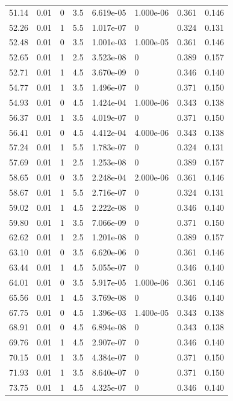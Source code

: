 \documentclass[preview]{standalone}
\begin{document}
{{{\begin{tabular}{L{1.2cm}C{1.2cm} C{0.3cm}C{0.5cm} C{1.4cm}C{1.4cm} C{1.4cm}C{1.4cm}}
  51.14  &  0.01  & 0     & 3.5 &  6.619e-05  & 1.000e-06  & 0.361 &  0.146   \\ 
  52.26  &  0.01  & 1     & 5.5 &  1.017e-07  & 0  & 0.324 &  0.131   \\ 
  52.48  &  0.01  & 0     & 3.5 &  1.001e-03  & 1.000e-05  & 0.361 &  0.146   \\ 
  52.65  &  0.01  & 1     & 2.5 &  3.523e-08  & 0  & 0.389 &  0.157   \\ 
  52.71  &  0.01  & 1     & 4.5 &  3.670e-09  & 0  & 0.346 &  0.140   \\ 
  54.77  &  0.01  & 1     & 3.5 &  1.496e-07  & 0  & 0.371 &  0.150   \\ 
  54.93  &  0.01  & 0     & 4.5 &  1.424e-04  & 1.000e-06  & 0.343 &  0.138   \\ 
  56.37  &  0.01  & 1     & 3.5 &  4.019e-07  & 0  & 0.371 &  0.150   \\ 
  56.41  &  0.01  & 0     & 4.5 &  4.412e-04  & 4.000e-06  & 0.343 &  0.138   \\ 
  57.24  &  0.01  & 1     & 5.5 &  1.783e-07  & 0  & 0.324 &  0.131   \\ 
  57.69  &  0.01  & 1     & 2.5 &  1.253e-08  & 0  & 0.389 &  0.157   \\ 
  58.65  &  0.01  & 0     & 3.5 &  2.248e-04  & 2.000e-06  & 0.361 &  0.146   \\ 
  58.67  &  0.01  & 1     & 5.5 &  2.716e-07  & 0  & 0.324 &  0.131   \\ 
  59.02  &  0.01  & 1     & 4.5 &  2.222e-08  & 0  & 0.346 &  0.140   \\ 
  59.80  &  0.01  & 1     & 3.5 &  7.066e-09  & 0  & 0.371 &  0.150   \\ 
  62.62  &  0.01  & 1     & 2.5 &  1.201e-08  & 0  & 0.389 &  0.157   \\ 
  63.10  &  0.01  & 0     & 3.5 &  6.620e-06  & 0  & 0.361 &  0.146   \\ 
  63.44  &  0.01  & 1     & 4.5 &  5.055e-07  & 0  & 0.346 &  0.140   \\ 
  64.01  &  0.01  & 0     & 3.5 &  5.917e-05  & 1.000e-06  & 0.361 &  0.146   \\ 
  65.56  &  0.01  & 1     & 4.5 &  3.769e-08  & 0  & 0.346 &  0.140   \\ 
  67.75  &  0.01  & 0     & 4.5 &  1.396e-03  & 1.400e-05  & 0.343 &  0.138   \\ 
  68.91  &  0.01  & 0     & 4.5 &  6.894e-08  & 0  & 0.343 &  0.138   \\ 
  69.76  &  0.01  & 1     & 4.5 &  2.907e-07  & 0  & 0.346 &  0.140   \\ 
  70.15  &  0.01  & 1     & 3.5 &  4.384e-07  & 0  & 0.371 &  0.150   \\ 
  71.93  &  0.01  & 1     & 3.5 &  8.640e-07  & 0  & 0.371 &  0.150   \\ 
  73.75  &  0.01  & 1     & 4.5 &  4.325e-07  & 0  & 0.346 &  0.140   \\ 
\hline 
\end{tabular} 

}}}
\end{document}
